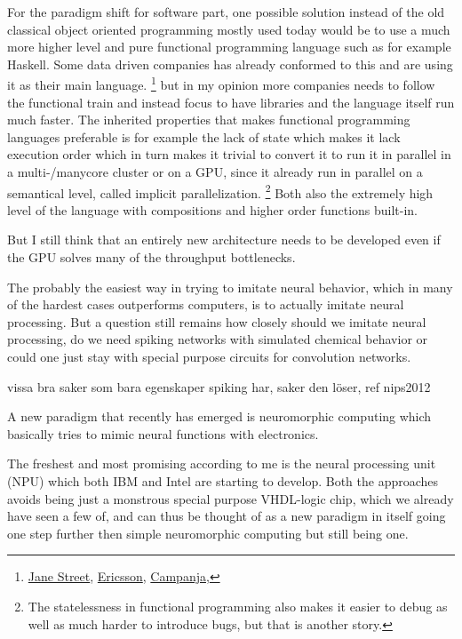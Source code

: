 \documentclass{article}
\begin{document}
    For the paradigm shift for software part,
    one possible solution instead of the old classical object oriented
    programming mostly used today would be to use a much more higher level and
    pure functional programming language such as
    for example Haskell. Some data driven companies has
    already conformed to this and are using it as their main language.
    \footnote{
        \href{http://www.janestreet.com}{Jane Street},
        \href{http://www.ericsson.com}{Ericsson},
        \href{http://www.campanja.com}{Campanja},
    }
    but in my opinion more companies needs to follow the functional train and
    instead focus to have libraries and the language itself run much faster.
    The inherited properties that makes functional programming languages 
    preferable is for example the lack of state 
    which makes it lack execution order which in turn makes it
    trivial to convert it to run it in parallel in a multi-/manycore cluster
    or on a GPU, since it already run in parallel on a semantical level, called
    implicit parallelization\cite{something}.
    \footnote{The statelessness in functional programming also makes it easier 
    to debug as well as much harder to introduce bugs, but that is another 
    story.} 
    Both also the extremely high level of the language with
    compositions and higher order functions built-in.\cite{haskell}

    But I still think that an entirely new architecture needs to be developed 
    even if the GPU solves many of the throughput bottlenecks.
    
    The probably the easiest way in trying to imitate neural behavior, 
    which in many of the hardest cases outperforms computers, is to actually
    imitate neural processing. But a question still remains how closely should
    we imitate neural processing, do we need spiking networks with simulated
    chemical behavior or could one just stay with special purpose circuits 
    for convolution networks.

    vissa bra saker som bara egenskaper spiking har, saker den löser, ref nips2012

    A new paradigm that recently has emerged is neuromorphic
    computing which basically tries to mimic neural functions with electronics.
    
    The freshest and most promising according to me is the 
    neural processing unit (NPU) which both IBM\cite{synapse} and
    Intel\cite{intelneuro} are starting to develop. Both the approaches avoids 
    being just a monstrous special purpose VHDL-logic chip, which we already 
    have seen a few of, and can thus be thought of as a new paradigm in itself 
    going one step further then simple neuromorphic computing but still being 
    one.
\end{document}
